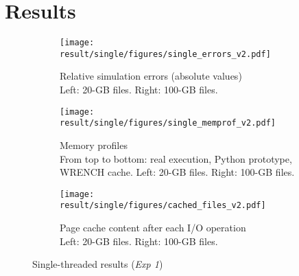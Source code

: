 \documentclass[conference]{IEEEtran}
\newcommand{\wrench}{WRENCH\xspace}
\begin{document}


    \section{Results}
    \label{results}

    \begin{figure*}
        \centering
        \begin{subfigure}{\linewidth}
            \centering
               \texttt{[image: result/single/figures/single\_errors\_v2.pdf]}
               \vspace*{-0.7cm}
               \caption{Relative simulation errors (absolute values)\\ Left: 20-GB files. Right: 100-GB files.}
                \vspace*{0.2cm}
               \label{fig:single_error}
            \end{subfigure}
        \begin{subfigure}{\linewidth}
            \centering
               \texttt{[image: result/single/figures/single\_memprof\_v2.pdf]}
               \vspace*{-0.7cm}
               \caption{Memory profiles\\ From top to bottom: real execution, Python prototype, WRENCH cache. Left: 20-GB files. Right: 100-GB files.}
               \vspace*{0.2cm}
               \label{fig:single_memprof}
        \end{subfigure}
        \begin{subfigure}{\linewidth}
            \centering
               \texttt{[image: result/single/figures/cached\_files\_v2.pdf]}
               \caption{Page cache content after each I/O operation\\Left: 20-GB files. Right: 100-GB files.}
               \label{fig:single_cache}
        \end{subfigure}
        \caption{Single-threaded results (\textit{Exp 1})}
        \end{figure*}
\end{document}
